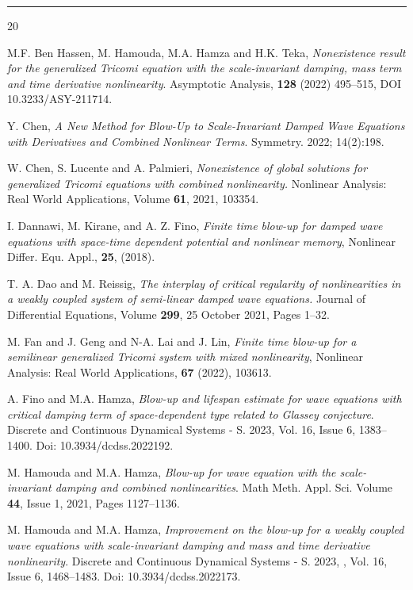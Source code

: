 \documentclass[12pt,leqno]{amsart}
\numberwithin{equation}{section}
\theoremstyle{remark}
\begin{document}
\hrule  



\begin{thebibliography}{20}

{M.F. Ben Hassen, M. Hamouda, M.A. Hamza and H.K. Teka}, {\it  Nonexistence result for the generalized Tricomi  equation with  the  scale-invariant damping, mass term  and time derivative nonlinearity}. Asymptotic Analysis, {\bf 128} (2022) 495--515, DOI 10.3233/ASY-211714.

 Y. Chen, 
{\it   A New Method for Blow-Up to Scale-Invariant Damped Wave Equations with Derivatives and Combined Nonlinear Terms}. Symmetry. 2022; 14(2):198. 

 W. Chen, S. Lucente and A. Palmieri, 
{\it Nonexistence of global solutions for generalized Tricomi equations with combined nonlinearity.} Nonlinear Analysis: Real World Applications, Volume {\bf 61}, 2021, 
103354.

{I. Dannawi, M. Kirane, and A. Z. Fino},
{\it Finite time blow-up for damped wave equations with space-time dependent potential and nonlinear memory},
 Nonlinear Differ. Equ. Appl.,
 {\bf 25},  {(2018)}.

{T. A. Dao and M. Reissig,} 
{\it The interplay of critical regularity of nonlinearities in a weakly coupled system of semi-linear damped wave equations.} Journal of Differential Equations, Volume {\bf 299}, 25 October 2021, Pages 1--32.



{M. Fan and J. Geng and N-A. Lai and J. Lin,} {\it  Finite time blow-up for a semilinear generalized Tricomi system with mixed nonlinearity},
{Nonlinear Analysis: Real World Applications},
 {\bf 67} (2022),
 {103613}.

{A. Fino and M.A. Hamza}, {\it  Blow-up and lifespan estimate for wave equations with critical damping term of space-dependent type related to Glassey conjecture}. Discrete and Continuous Dynamical Systems - S.   2023, Vol. 16, Issue 6, 1383--1400. Doi: 10.3934/dcdss.2022192.



{M. Hamouda and M.A. Hamza}, {\it  Blow-up for  wave equation  with the  scale-invariant damping and combined nonlinearities}. Math Meth. Appl. Sci. Volume {\bf 44}, Issue 1,  2021, Pages 1127--1136.

{M. Hamouda and M.A. Hamza}, {\it  Improvement on the blow-up for a weakly coupled wave equations with scale-invariant damping and mass and time derivative nonlinearity}. Discrete and Continuous Dynamical Systems - S. 2023, , Vol. 16, Issue 6, 1468--1483. Doi: 10.3934/dcdss.2022173.



\end{thebibliography}
\end{document}
